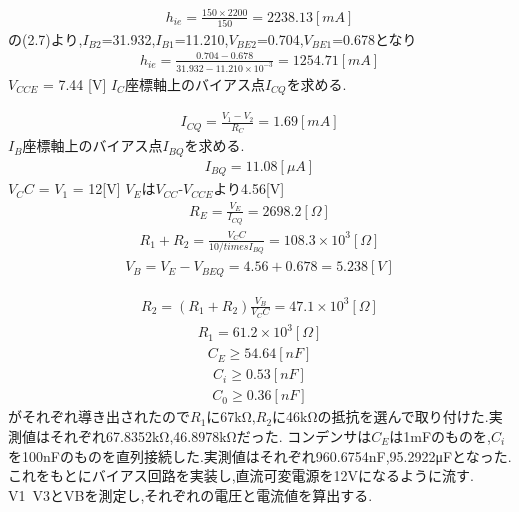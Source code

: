 \documentclass[a4j,10pt,dvipdfmx]{jarticle}
\begin{document}
\begin{eqnarray}
  \label{hie}
  h_{ie}=\frac{150\times{2200}}{150}=2238.13[mA]
\end{eqnarray}
\cite{a}の(2.7)より,$I_{B2}$=31.932,$I_{B1}$=11.210,$V_{BE2}$=0.704,$V_{BE1}$=0.678となり
\begin{eqnarray}
  \label{hie2}
  h_{ie}=\frac{0.704-0.678}{31.932-11.210\times10^{-3}}=1254.71[mA]
\end{eqnarray}
$V_{CCE}$ = 7.44 [V]
$I_C$座標軸上のバイアス点$I_{CQ}$を求める.

\begin{eqnarray}
  \label{icq}
  I_{CQ}=\frac{V_1-V_2}{R_C}=1.69[mA]
\end{eqnarray}
$I_B$座標軸上のバイアス点$I_{BQ}$を求める.
\begin{eqnarray}
I_{BQ}=11.08[\mu{A}]
\end{eqnarray}
$V_CC$ = $V_1$ = 12[V]
$V_E$は$V_{CC}$-$V_{CCE}$より4.56[V]
\begin{eqnarray}
R_E = \frac{V_E}{I_{CQ}}=2698.2[Ω]
\end{eqnarray}
\begin{eqnarray}
  \label{r1r2}
  R_1 +R_2= \frac{V_CC}{10/times{I_{BQ}}}=108.3\times10^{3}[Ω]
  \end{eqnarray}
\begin{eqnarray}
  \label{vb}
  V_B = V_E - V_{BEQ} = 4.56+0.678=5.238[V]
\end{eqnarray}

\begin{eqnarray}
  \label{r2}
  R_2 = (R_1+R_2)\frac{V_B}{V_CC}= 47.1\times{10^3} [Ω]
\end{eqnarray}
\begin{eqnarray}
  \label{r1}
  R_1 = 61.2\times{10^{3}}[Ω]
\end{eqnarray}
\begin{eqnarray}
  \label{ce}
  C_E \geq{54.64}[nF]
\end{eqnarray}
\begin{eqnarray}
  \label{ci}
  C_i \geq{0.53}[nF]
\end{eqnarray}
\begin{eqnarray}
  \label{c0}
  C_0 \geq{0.36}[nF]
\end{eqnarray}
がそれぞれ導き出されたので$R_1$に67kΩ,$R_2$に46kΩの抵抗を選んで取り付けた.実測値はそれぞれ67.8352kΩ,46.8978kΩだった.
コンデンサは$C_E$は1mFのものを,$C_i$を100nFのものを直列接続した.実測値はそれぞれ960.6754nF,95.2922μFとなった.
これをもとにバイアス回路を実装し,直流可変電源を12Vになるように流す.
V1~V3とVBを測定し,それぞれの電圧と電流値を算出する.
\end{document}
